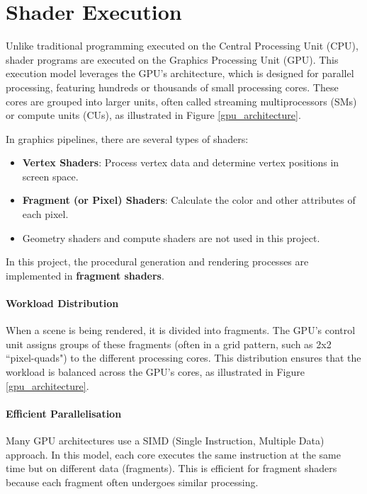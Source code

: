 


\section{Shader Execution}
\label{GPU}

Unlike traditional programming executed on the Central Processing Unit (CPU), shader programs are executed on the Graphics Processing Unit (GPU). This execution model leverages the GPU’s architecture, which is designed for parallel processing, featuring hundreds or thousands of small processing cores. These cores are grouped into larger units, often called streaming multiprocessors (SMs) or compute units (CUs), as illustrated in Figure \ref{gpu_architecture}.

In graphics pipelines, there are several types of shaders:
\begin{itemize}
    \item \textbf{Vertex Shaders}: Process vertex data and determine vertex positions in screen space.
    \item \textbf{Fragment (or Pixel) Shaders}: Calculate the color and other attributes of each pixel.
    \item Geometry shaders and compute shaders are not used in this project.
\end{itemize}

In this project, the procedural generation and rendering processes are implemented in \textbf{fragment shaders}.

\paragraph{Workload Distribution}
When a scene is being rendered, it is divided into fragments. The GPU's control unit assigns groups of these fragments (often in a grid pattern, such as 2x2 ``pixel-quads") to the different processing cores. This distribution ensures that the workload is balanced across the GPU's cores, as illustrated in Figure \ref{gpu_architecture}.

\paragraph{Efficient Parallelisation}
Many GPU architectures use a SIMD (Single Instruction, Multiple Data) approach. In this model, each core executes the same instruction at the same time but on different data (fragments). This is efficient for fragment shaders because each fragment often undergoes similar processing.

